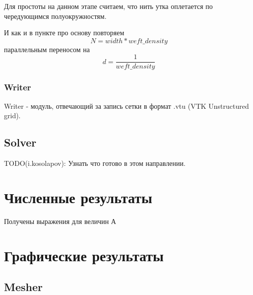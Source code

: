 Для простоты на данном этапе считаем, что нить утка оплетается по чередующимся полуокружностям.

И как и в пункте про основу повторяем
\[
    N = width * weft\_density
\]
параллельным переносом на
\[
    d = \frac{1}{weft\_density}
\]

\subsubsection*{Writer}
Writer - модуль, отвечающий за запись сетки в формат .vtu (VTK Unstructured grid).


\subsection*{Solver}
TODO(i.kosolapov): Узнать что готово в этом направлении.

\section*{Численные результаты}
Получены выражения для величин А

\section*{Графические результаты}
\subsection*{Mesher}
